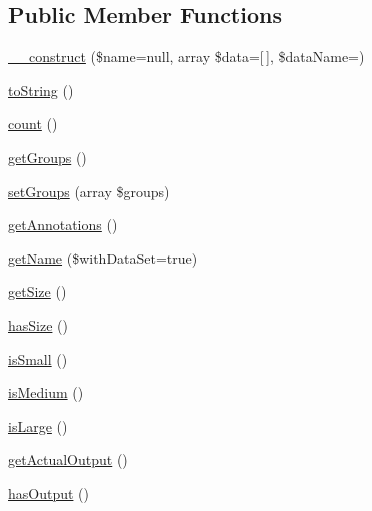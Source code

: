 \subsection*{Public Member Functions}
\begin{DoxyCompactItemize}
\item 
\mbox{\hyperlink{class_p_h_p_unit___framework___test_case_a9cfbfbed4e4bc82d7653086cbac0d2f6}{\+\_\+\+\_\+construct}} (\$name=null, array \$data=\mbox{[}$\,$\mbox{]}, \$data\+Name=\textquotesingle{}\textquotesingle{})
\item 
\mbox{\hyperlink{class_p_h_p_unit___framework___test_case_a5558c5d549f41597377fa1ea8a1cefa3}{to\+String}} ()
\item 
\mbox{\hyperlink{class_p_h_p_unit___framework___test_case_ac751e87b3d4c4bf2feb03bee8b092755}{count}} ()
\item 
\mbox{\hyperlink{class_p_h_p_unit___framework___test_case_a6187b4fda76a8055bd08acafa57d9824}{get\+Groups}} ()
\item 
\mbox{\hyperlink{class_p_h_p_unit___framework___test_case_a6c9312265388e10b769b9c585f505f6a}{set\+Groups}} (array \$groups)
\item 
\mbox{\hyperlink{class_p_h_p_unit___framework___test_case_ab416dfeda14d1f887d24d7633a502501}{get\+Annotations}} ()
\item 
\mbox{\hyperlink{class_p_h_p_unit___framework___test_case_ac0adb6264f478d5f7cfee90335b6d5bd}{get\+Name}} (\$with\+Data\+Set=true)
\item 
\mbox{\hyperlink{class_p_h_p_unit___framework___test_case_a75cce10cdf81be6dc84881c28b3379b7}{get\+Size}} ()
\item 
\mbox{\hyperlink{class_p_h_p_unit___framework___test_case_a994c9977f1ee4789d8e5665b49421c6b}{has\+Size}} ()
\item 
\mbox{\hyperlink{class_p_h_p_unit___framework___test_case_aa76654c83bde43aa261c2c03fe6ac977}{is\+Small}} ()
\item 
\mbox{\hyperlink{class_p_h_p_unit___framework___test_case_a2fb2cdcc4707037445dc5f7e60f3b527}{is\+Medium}} ()
\item 
\mbox{\hyperlink{class_p_h_p_unit___framework___test_case_a1d7efe7edac17270d4af8dafe8e950ef}{is\+Large}} ()
\item 
\mbox{\hyperlink{class_p_h_p_unit___framework___test_case_adb1eb282b1b571270206667a59b39d91}{get\+Actual\+Output}} ()
\item 
\mbox{\hyperlink{class_p_h_p_unit___framework___test_case_a40c1f31b3561484d42b06a2061273192}{has\+Output}} ()

\end{DoxyCompactItemize}

